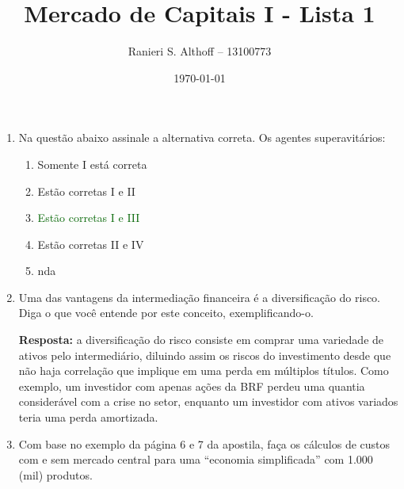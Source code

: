 \documentclass{article}
\begin{document}
\title{Mercado de Capitais I - Lista 1}
\author{Ranieri S. Althoff -- 13100773}
\date{\today}

\maketitle

\begin{enumerate}
    \item Na questão abaixo assinale a alternativa correta.
        Os agentes superavitários:


        \begin{enumerate}[label={(\alph*)},leftmargin=1cm]
            \item Somente I está correta
            \item Estão corretas I e II
            \item \textcolor{DarkGreen}{Estão corretas I e III}
            \item Estão corretas II e IV
            \item nda
        \end{enumerate}

    \item Uma das vantagens da intermediação financeira é a diversificação do
        risco. Diga o que você entende por este conceito, exemplificando-o.

        \textbf{Resposta:} a diversificação do risco consiste em comprar uma
        variedade de ativos pelo intermediário, diluindo assim os riscos do
        investimento desde que não haja correlação que implique em uma perda em
        múltiplos títulos. Como exemplo, um investidor com apenas ações da BRF
        perdeu uma quantia considerável com a crise no setor, enquanto um
        investidor com ativos variados teria uma perda amortizada.

    \item Com base no exemplo da página 6 e 7 da apostila, faça os cálculos de
        custos com e sem mercado central para uma “economia simplificada” com
        1.000 (mil) produtos.


\end{enumerate}
\end{document}
